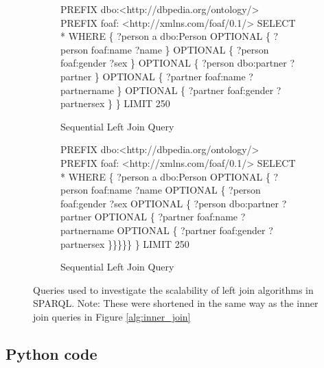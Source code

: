 \documentclass[10pt,a4paper]{article}
\begin{document}
	\begin{figure}[h!]
		\begin{subfigure}[b]{0.45\textwidth}
			\begin{algorithmic}
				\STATE PREFIX dbo:\textless http://dbpedia.org/ontology/\textgreater
				\STATE PREFIX foaf: \textless http://xmlns.com/foaf/0.1/\textgreater
				\STATE SELECT *
				\STATE WHERE \{
					\STATE 	?person a dbo:Person
					\STATE 	OPTIONAL \{ ?person foaf:name ?name \}
					\STATE 	OPTIONAL \{ ?person foaf:gender ?sex \}
					\STATE 	OPTIONAL \{ ?person dbo:partner ?partner \}
					\STATE 	OPTIONAL \{ ?partner foaf:name ?partnername \}
					\STATE 	OPTIONAL \{ ?partner foaf:gender ?partnersex \}
					\STATE \}
				\STATE LIMIT 250
			\end{algorithmic}
			\caption{Sequential Left Join Query}
			\label{alg:seq_left_join}
		\end{subfigure}
		\begin{subfigure}[b]{0.45\textwidth}
			\begin{algorithmic}
				\STATE PREFIX dbo:\textless http://dbpedia.org/ontology/\textgreater
				\STATE PREFIX foaf: \textless http://xmlns.com/foaf/0.1/\textgreater
				\STATE SELECT *
				\STATE WHERE \{
					\STATE 	?person a dbo:Person
					\STATE 	OPTIONAL \{ ?person foaf:name ?name
					\STATE 	OPTIONAL \{ ?person foaf:gender ?sex
					\STATE 	OPTIONAL \{ ?person dbo:partner ?partner
					\STATE 	OPTIONAL \{ ?partner foaf:name ?partnername
					\STATE 	OPTIONAL \{ ?partner foaf:gender ?partnersex
					\STATE  \}\}\}\}\}
					\STATE \}
				\STATE LIMIT 250
			\end{algorithmic}
			\caption{Sequential Left Join Query}
			\label{alg:nested_left_join}
		\end{subfigure}
		\caption{Queries used to investigate the scalability of left join algorithms in SPARQL. Note: These were shortened in the same way as the inner join queries in Figure \ref{alg:inner_join}}
		\label{left_join_queries}
	\end{figure}
	
	\pagebreak
	\subsection*{Python code}
	
\end{document}
